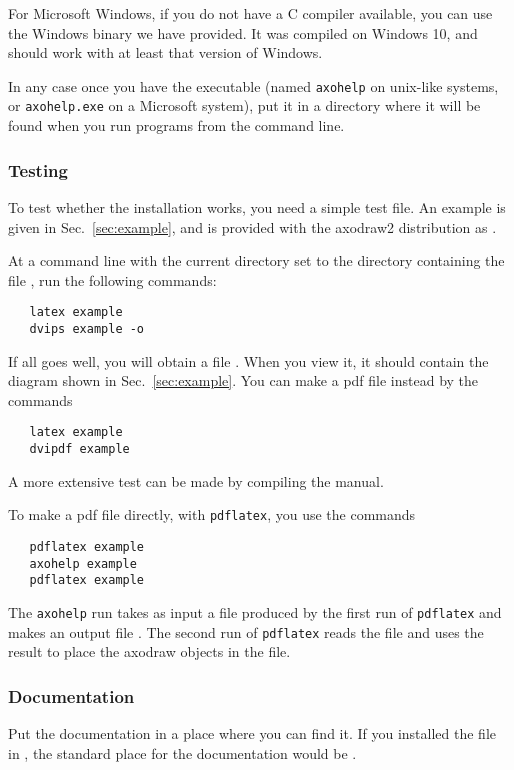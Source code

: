\documentclass[12pt]{article}
\def\program#1{\texttt{#1}}
\begin{document}
For Microsoft Windows, if you do not have a C compiler available, you
can use the Windows binary  we have provided.  It
was compiled on Windows 10, and should work with at least that version
of Windows.

In any case once you have the executable (named \program{axohelp} on
unix-like systems, or \program{axohelp.exe} on a Microsoft system), put
it in a directory where it will be found when you run programs from
the command line.


\subsubsection{Testing}

To test whether the installation works, you need a simple test file.
An example is given in Sec.\ \ref{sec:example}, and is provided
with the axodraw2 distribution as .

At a command line with the current directory set to the directory
containing the file , run the following commands:
\begin{verbatim}
   latex example
   dvips example -o
\end{verbatim}
If all goes well, you will obtain a file .  When
you view it, it should contain the diagram shown in Sec.\
\ref{sec:example}.  You can make a pdf file instead by the commands
\begin{verbatim}
   latex example
   dvipdf example
\end{verbatim}
A more extensive test can be made by compiling the manual.

To make a pdf file directly, with \program{pdflatex}, you use the commands
\begin{verbatim}
   pdflatex example
   axohelp example
   pdflatex example
\end{verbatim}
The \program{axohelp} run takes as input a file 
produced by the first run of \program{pdflatex} and makes an output
file .  The second run of \program{pdflatex} reads
the \file{example.ax2} file and uses the result to place the axodraw
objects in the \file{example.pdf} file.


\subsubsection{Documentation}

Put the documentation in a place where you can find it.  If you
installed the  file in
, the 
standard place for the documentation would be
.
\end{document}
